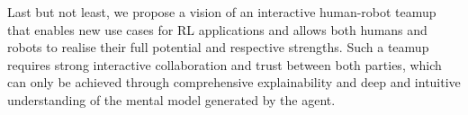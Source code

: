 \documentclass[twoside,11pt]{article}
\begin{document}
Last but not least, we propose a vision of an interactive human-robot teamup that enables new use cases for RL applications and allows both humans and robots to realise their full potential and respective strengths. Such a teamup requires strong interactive collaboration and trust between both parties, which can only be achieved through comprehensive explainability and deep and intuitive understanding of the mental model generated by the agent.

\end{document}
